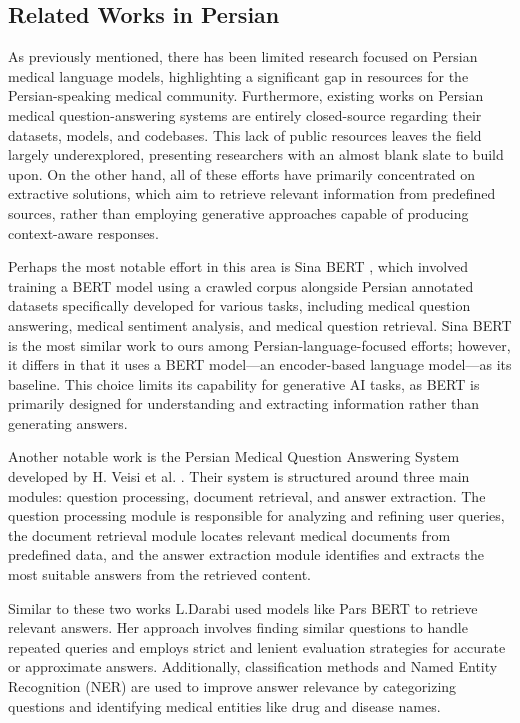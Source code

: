 \documentclass[conference]{IEEEtran}
\begin{document}
\subsection{Related Works in Persian}
As previously mentioned, there has been limited research focused on Persian medical language models, highlighting a significant gap in resources for the Persian-speaking medical community. Furthermore, existing works on Persian medical question-answering systems are entirely closed-source regarding their datasets, models, and codebases. This lack of public resources leaves the field largely underexplored, presenting researchers with an almost blank slate to build upon. On the other hand, all of these efforts have primarily concentrated on extractive solutions, which aim to retrieve relevant information from predefined sources, rather than employing generative approaches capable of producing context-aware responses.

Perhaps the most notable effort in this area is Sina BERT \cite{b4}, which involved training a BERT model using a crawled corpus alongside Persian annotated datasets specifically developed for various tasks, including medical question answering, medical sentiment analysis, and medical question retrieval. Sina BERT is the most similar work to ours among Persian-language-focused efforts; however, it differs in that it uses a BERT model—an encoder-based language model—as its baseline. This choice limits its capability for generative AI tasks, as BERT is primarily designed for understanding and extracting information rather than generating answers.

Another notable work is the Persian Medical Question Answering System developed by H. Veisi et al.
\cite{b11}.
Their system is structured around three main modules: question processing, document retrieval, and answer extraction. The question processing module is responsible for analyzing and refining user queries, the document retrieval module locates relevant medical documents from predefined data, and the answer extraction module identifies and extracts the most suitable answers from the retrieved content.

Similar to these two works L.Darabi
\cite{b12}
used models like Pars BERT
\cite{b13}
to retrieve relevant answers. Her approach involves finding similar questions to handle repeated queries and employs strict and lenient evaluation strategies for accurate or approximate answers. Additionally, classification methods and Named Entity Recognition (NER) are used to improve answer relevance by categorizing questions and identifying medical entities like drug and disease names.
\end{document}
